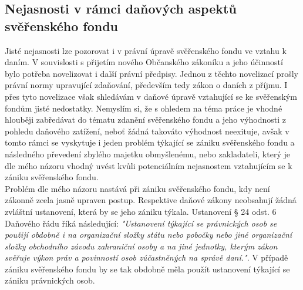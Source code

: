 \documentclass{article}
\begin{document}
\subsection{Nejasnosti v rámci daňových aspektů svěřenského fondu}


Jisté nejasnosti lze pozorovat i v právní úpravě svěřenského fondu ve vztahu k daním. V souvislosti s přijetím nového Občanského zákoníku a jeho účinností bylo potřeba novelizovat i další právní předpisy. Jednou z těchto novelizací prošly právní normy upravující zdaňování, především tedy zákon o daních z příjmu. I přes tyto novelizace však shledávám v daňové úpravě vztahující se ke svěřenským fondům jisté nedostatky. Nemyslím si, že s ohledem na téma práce je vhodné hlouběji zabředávat do tématu zdanění svěřenského fondu a jeho výhodnosti z pohledu daňového zatížení, neboť žádná takováto výhodnost neexituje, avšak v tomto rámci se vyskytuje i jeden problém týkající se zániku svěřenského fondu a následného převedení zbylého majetku obmyšlenému, nebo zakladateli, který je dle mého názoru vhodný uvést kvůli potenciálním nejasnostem vztahujícím se k zániku svěřenského fondu.\\


Problém dle mého názoru nastává při zániku svěřenského fondu, kdy není zákonně zcela jasně upraven postup. Respektive daňové zákony neobsahují žádná zvláštní ustanovení, která by se jeho zániku týkala. Ustanovení § 24 odst. 6 Daňového řádu říká následující: \textit{"Ustanovení týkající se právnických osob se použijí obdobně i na organizační složky státu nebo pobočky nebo jiné organizační složky obchodního závodu zahraniční osoby a na jiné jednotky, kterým zákon svěřuje výkon práv a povinností osob zúčastněných na správě daní."}. V případě zániku svěřenského fondu by se tak obdobně měla použít ustanovení týkající se zániku právnických osob.\\
\end{document}
